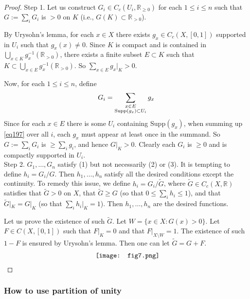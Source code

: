 \documentclass[12pt,b5paper,notitlepage]{article}
\theoremstyle{definition}
\theoremstyle{plain}
\newcommand{\wtd}{\widetilde}
\newcommand{\Rbb}{\mathbb R}
\newcommand{\Supp}{\mathrm{Supp}}
\numberwithin{equation}{section}
\begin{document}
\begin{proof}
Step 1. Let us construct $G_i\in C_c(U_i,\Rbb_{\geq0})$ for each $1\leq i\leq n$ such that $G:=\sum_i G_i$ is $>0$ on $K$ (i.e., $G(K)\subset\Rbb_{>0}$).  

By Urysohn's lemma, for each $x\in X$ there exists $g_x\in C_c(X,[0,1])$ supported in $U_i$ such that $g_x(x)\neq 0$. Since $K$ is compact and is contained in $\bigcup_{x\in K}g_x^{-1}(\Rbb_{>0})$, there exists a finite subset $E\subset K$ such that $K\subset \bigcup_{x\in E}g_x^{-1}(\Rbb_{>0})$. So $\sum_{x\in E}g_x\big|_K>0$. 

Now, for each $1\leq i\leq n$, define
\begin{align}\label{eq197}
G_i=\sum_{
\begin{subarray}{c}
x\in E\\
\Supp(g_x)\subset U_i
\end{subarray}}
g_x
\end{align}
Since for each $x\in E$ there is some $U_i$ containing $\Supp(g_x)$, when summing up \eqref{eq197} over all $i$, each $g_x$ must appear at least once in the summand. So $G:=\sum_i G_i$ is $\geq \sum_i g_i$, and hence $G|_K>0$. Clearly each $G_i$ is $\geq0$ and is compactly supported in $U_i$. \\[-1ex]


Step 2. $G_1,\dots,G_n$ satisfy (1) but not necessarily (2) or (3). It is tempting to define $h_i=G_i/G$. Then $h_1,\dots,h_n$ satisfy all the desired conditions except the continuity. To remedy this issue, we define $h_i=G_i/\wtd G$, where $\wtd G\in C_c(X,\Rbb)$ satisfies that $\wtd G>0$ on $X$, that $\wtd G\geq G$ (so that $0\leq \sum_ih_i\leq 1$), and that $\wtd G|_K=G|_K$ (so that $\sum_i h_i|_K=1$). Then $h_1,\dots,h_n$ are the desired functions.

Let us prove the existence of such $\wtd G$. Let $W=\{x\in X:G(x)>0\}$. Let $F\in C(X,[0,1])$ such that $F|_K=0$ and that $F|_{X\setminus W}=1$. The existence of such $1-F$ is ensured by Urysohn's lemma. Then one can let $\wtd G=G+F$. 
\begin{align*}
\vcenter{\hbox{{
			\texttt{[image: fig7.png]}}}}
\end{align*}
\end{proof}





\subsubsection{How to use partition of unity}\label{lb490}
\end{document}
